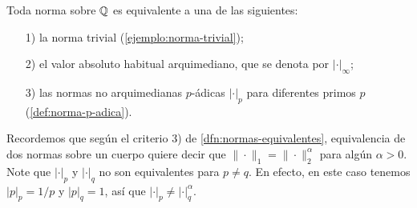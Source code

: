 \documentclass{article}
\numberwithin{equation}{section}
\theoremstyle{definition}
\begin{document}
\begin{teorema}
  \label{thm:ostrowski}
  Toda norma sobre $\mathbb{Q}$ es equivalente a una de las siguientes:

  \begin{enumerate}
  \item[1)] la norma trivial (\ref{ejemplo:norma-trivial});

  \item[2)] el valor absoluto habitual arquimediano, que se denota por
    $|\cdot|_\infty$;

  \item[3)] las normas no arquimedianas $p$-ádicas $|\cdot|_p$ para diferentes
    primos $p$ (\ref{def:norma-p-adica}).
  \end{enumerate}
\end{teorema}

Recordemos que según el criterio 3) de \ref{dfn:normas-equivalentes},
equivalencia de dos normas sobre un cuerpo quiere decir que
$\|\cdot\|_1 = \|\cdot\|_2^\alpha$ para algún $\alpha > 0$. Note que $|\cdot|_p$
y $|\cdot|_q$ no son equivalentes para $p \ne q$. En efecto, en este caso
tenemos $|p|_p = 1/p$ y $|p|_q = 1$, así que $|\cdot|_p \ne |\cdot|_q^\alpha$.
\end{document}
